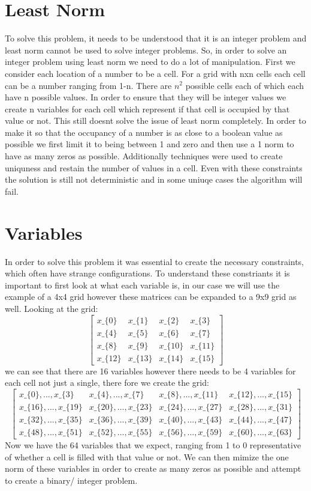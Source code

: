 \documentclass[12pt]{article}
\begin{document}
\section{Least Norm}
To solve this problem, it needs to be understood that it is an integer problem and least norm cannot be used to solve
integer problems. So, in order to solve an integer problem using least norm we need to do a lot of manipulation. First
we consider each location of a number to be a cell. For a grid with nxn cells each cell can be a number ranging from 1-n.
There are $n^2$ possible cells each of which each have n possible values. In order to ensure that they will be integer values
we create n variables for each cell which represent if that cell is occupied by that value or not. This still doesnt
solve the issue of least norm completely. In order to make it so that the occupancy of a number is as close to a boolean value
as possible we first limit it to being between 1 and zero and then use a 1 norm to have as many zeros as possible. Additionally
techniques were used to create uniquness and restain the number of values in a cell. Even with these constraints the solution
is still not deterministic and in some uniuqe cases the algorithm will fail.

\section{Variables}
In order to solve this problem it was essential to create the necessary constraints, which often have strange configurations.
To understand these constriants it is important to first look at what each variable is, in our case we will use the example of a 4x4
grid however these matrices can be expanded to a 9x9 grid as well. Looking at the grid:
$$
\begin{bmatrix}
x\_\{0\}  & x\_\{1\}  & x\_\{2\}  & x\_\{3\}  \\
x\_\{4\}  & x\_\{5\}  & x\_\{6\}  & x\_\{7\}  \\
x\_\{8\}  & x\_\{9\}  & x\_\{10\} & x\_\{11\} \\
x\_\{12\} & x\_\{13\} & x\_\{14\} & x\_\{15\}
\end{bmatrix}
$$
we can see that there are 16 variables however there needs to be 4 variables for each cell not just a single, there fore we create the grid:
$$
\begin{bmatrix}
x\_\{0\},...,x\_\{3\}   & x\_\{4\},...,x\_\{7\}   & x\_\{8\},...,x\_\{11\}  & x\_\{12\},...,x\_\{15\} \\
x\_\{16\},...,x\_\{19\} & x\_\{20\},...,x\_\{23\} & x\_\{24\},...,x\_\{27\} & x\_\{28\},...,x\_\{31\} \\
x\_\{32\},...,x\_\{35\} & x\_\{36\},...,x\_\{39\} & x\_\{40\},...,x\_\{43\} & x\_\{44\},...,x\_\{47\} \\
x\_\{48\},...,x\_\{51\} & x\_\{52\},...,x\_\{55\} & x\_\{56\},...,x\_\{59\} & x\_\{60\},...,x\_\{63\}
\end{bmatrix}
$$
Now we have the 64 variables that we expect, ranging from 1 to 0 representative of whether a cell is filled with that value or not.
We can then mimize the one norm of these variables in order to create as many zeros as possible and attempt to create a binary/
integer problem.
\end{document}
